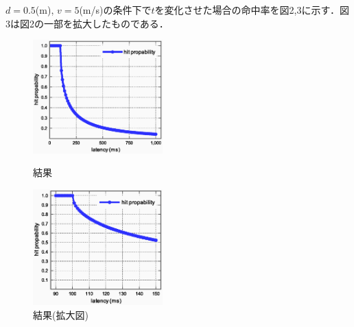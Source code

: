 \documentclass[a4j]{jarticle}
\begin{document}
$d=0.5$(m), $v=5$(m/s)の条件下で$t$を変化させた場合の命中率を図2,3に示す．図3は図2の一部を拡大したものである．
\begin{figure}[b]
\begin{minipage}{0.5\hsize}
\begin{center}
	\includegraphics[width=5.0cm]{1000mstest.eps}
	\caption{結果}
\end{center}
\end{minipage}
\begin{minipage}{0.5\hsize}
\begin{center}
	\includegraphics[width=5.0cm]{150mstest.eps}
	\caption{結果(拡大図)}
\end{center}
\end{minipage}
\end{figure}
\end{document}
